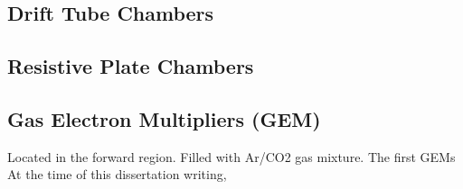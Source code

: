 





\subsection{Drift Tube Chambers}
\label{subsec:dt}

\subsection{Resistive Plate Chambers}
\label{subsec:rpc}

\subsection{Gas Electron Multipliers (GEM)}
\label{subsec:gem}


Located in the forward region.
Filled with Ar/CO2 gas mixture.
The first GEMs At the time of this dissertation writing, 







